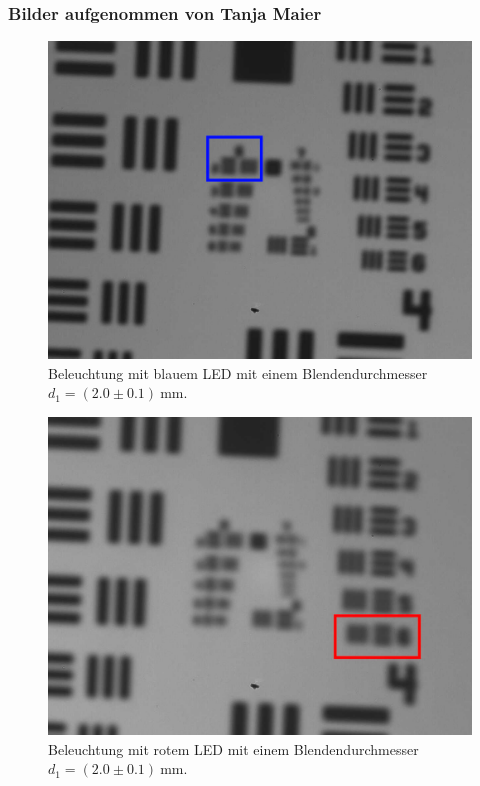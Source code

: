 \documentclass{article}
\begin{document}
\subsubsection{Bilder aufgenommen von Tanja Maier}
\begin{minipage}[t]{.45\textwidth}
\begin{figure}[H]
\includegraphics[scale=0.5]{tm/Bild_blau_kleine Lochblende.jpg}
\caption{Beleuchtung mit blauem LED mit einem Blendendurchmesser $d_1=(2.0\pm0.1)~$mm.}
\label{fig:bbild_2_blau_tm}
\end{figure}
\end{minipage}
\hfill
\noindent
\begin{minipage}[t]{.45\textwidth}
\begin{figure}[H]
\includegraphics[scale=0.5]{tm/Bild_rot_kleine Lochblende.jpg}
\caption{Beleuchtung mit rotem LED mit einem Blendendurchmesser $d_1=(2.0\pm0.1)~$mm.}
\label{fig:bbild_2_rot_tm}
\end{figure}
\end{minipage}
\end{document}

